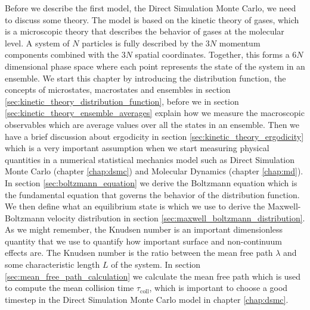 Before we describe the first model, the Direct Simulation Monte Carlo, we need to discuss some theory. The model is based on the kinetic theory of gases, which is a microscopic theory that describes the behavior of gases at the molecular level. A system of $N$ particles is fully described by the $3N$ momentum components combined with the $3N$ spatial coordinates. Together, this forms a $6N$ dimensional phase space where each point represents the state of the system in an ensemble. We start this chapter by introducing the distribution function, the concepts of microstates, macrostates and ensembles in section \ref{sec:kinetic_theory_distribution_function}, before we in section \ref{sec:kinetic_theory_ensemble_averages} explain how we measure the macroscopic observables which are average values over all the states in an ensemble. Then we have a brief discussion about ergodicity in section \ref{sec:kinetic_theory_ergodicity} which is a very important assumption when we start measuring physical quantities in a numerical statistical mechanics model such as Direct Simulation Monte Carlo (chapter \ref{chap:dsmc}) and Molecular Dynamics (chapter \ref{chap:md}). In section \ref{sec:boltzmann_equation} we derive the Boltzmann equation which is the fundamental equation that governs the behavior of the distribution function. We then define what an equilibrium state is which we use to derive the Maxwell-Boltzmann velocity distribution in section \ref{sec:maxwell_boltzmann_distribution}. As we might remember, the Knudsen number is an important dimensionless quantity that we use to quantify how important surface and non-continuum effects are. The Knudsen number is the ratio between the mean free path $\lambda$ and some characteristic length $L$ of the system. In section \ref{sec:mean_free_path_calculation} we calculate the mean free path which is used to compute the mean collision time $\tau_\text{coll}$, which is important to choose a good timestep in the Direct Simulation Monte Carlo model in chapter \ref{chap:dsmc}.
